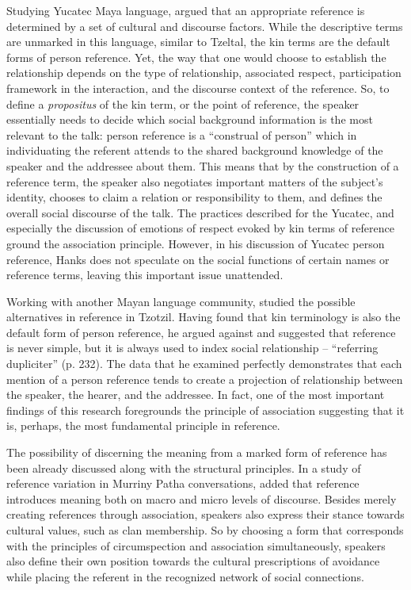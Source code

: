 \documentclass[12pt, draft]{article}
\begin{document}
Studying Yucatec Maya language, \textcite{hanks2007} argued that an appropriate reference is determined by a set of cultural and discourse factors. While the descriptive terms are unmarked in this language, similar to Tzeltal, the kin terms are the default forms of person reference. Yet, the way that one would choose to establish the relationship depends on the type of relationship, associated respect, participation framework in the interaction, and the discourse context of the reference. So, to define a \textit{propositus} of the kin term, or the point of reference, the speaker essentially needs to decide which social background information is the most relevant to the talk: person reference is a ``construal of person'' \parencite[p. 149]{hanks2007} which in individuating the referent attends to the shared background knowledge of the speaker and the addressee about them. This means that by the construction of a reference term, the speaker also negotiates important matters of the subject's identity, chooses to claim a relation or responsibility to them, and defines the overall social discourse of the talk. The practices described for the Yucatec, and especially the discussion of emotions of respect evoked by kin terms of reference ground the association principle. However, in his discussion of Yucatec person reference, Hanks does not speculate on the social functions of certain names or reference terms, leaving this important issue unattended.

Working with another Mayan language community, \textcite{haviland2007} studied the possible alternatives in reference in Tzotzil. Having found that kin terminology is also the default form of person reference, he argued against \textcite{schegloff1996b} and suggested that reference is never simple, but it is always used to index social relationship -- ``referring dupliciter'' (p. 232). The data that he examined perfectly demonstrates that each mention of a person reference tends to create a projection of relationship between the speaker, the hearer, and the addressee. In fact, one of the most important findings of this research foregrounds the principle of association suggesting that it is, perhaps, the most fundamental principle in reference.

The possibility of discerning the meaning from a marked form of reference has been already discussed along with the structural principles. In a study of reference variation in Murriny Patha conversations, \textcite{blythe2009} added that reference introduces meaning both on macro and micro levels of discourse. Besides merely creating references through association, speakers also express their stance towards cultural values, such as clan membership. So by choosing a form that corresponds with the principles of circumspection and association simultaneously, speakers also define their own position towards the cultural prescriptions of avoidance while placing the referent in the recognized network of social connections.
\end{document}
